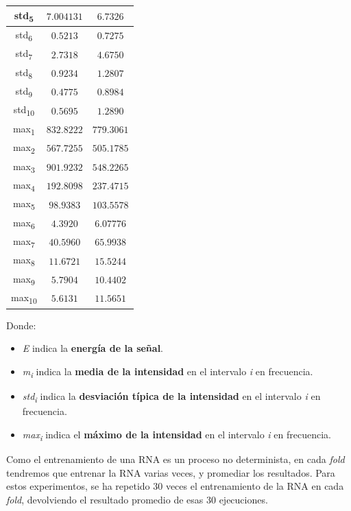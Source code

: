 \documentclass[12pt]{article}
\begin{document}
\begin{table}[!ht]
\begin{tabular}{||c c c||}
			\hline
			std\textsubscript{5} & $7.004131$ & $6.7326$ \\
			\hline
			std\textsubscript{6} & $0.5213$ & $0.7275$ \\
			\hline
			std\textsubscript{7} & $2.7318$ & $4.6750$ \\
			\hline
			std\textsubscript{8} & $0.9234$ & $1.2807$ \\
			\hline
			std\textsubscript{9} & $0.4775$ & $0.8984$ \\
			\hline
			std\textsubscript{10} & $0.5695$ & $1.2890$ \\
			\hline
			max\textsubscript{1} & $832.8222$ & $779.3061$ \\
			\hline
			max\textsubscript{2} & $567.7255$ & $505.1785$ \\
			\hline
			max\textsubscript{3} & $901.9232$ & $548.2265$ \\
			\hline
			max\textsubscript{4} & $192.8098$ & $237.4715$ \\
			\hline
			max\textsubscript{5} & $98.9383$ & $103.5578$ \\
			\hline
			max\textsubscript{6} & $4.3920$ & $6.07776$ \\
			\hline
			max\textsubscript{7} & $40.5960$ & $65.9938$ \\
			\hline
			max\textsubscript{8} & $11.6721$ & $15.5244$ \\
			\hline
			max\textsubscript{9} & $5.7904$ & $10.4402$ \\
			\hline
			max\textsubscript{10} & $5.6131$ & $11.5651$ \\
			\hline
		\end{tabular}
	\label{Tab:Features_1}
\end{table}
Donde:
\begin{itemize}
	\item \textit{E} indica la \textbf{energía de la señal}.
	\item \textit{m\textsubscript{i}} indica la \textbf{media de la intensidad} en el intervalo \textit{i} en frecuencia.
	\item \textit{std\textsubscript{i}} indica la \textbf{desviación típica de la intensidad} en el intervalo \textit{i} en frecuencia.
	\item \textit{max\textsubscript{i}} indica el \textbf{máximo de la intensidad} en el intervalo \textit{i} en frecuencia.
\end{itemize}	

\newpage
Como el entrenamiento de una RNA es un proceso no determinista, en cada \textit{fold}
tendremos que entrenar la RNA varias veces, y promediar los resultados. Para estos experimentos,
se ha repetido 30 veces el entrenamiento de la RNA en cada \textit{fold}, devolviendo el resultado promedio de esas 30 ejecuciones.
\end{document}
